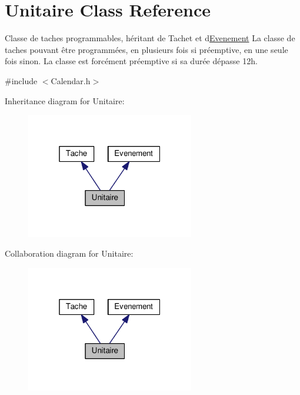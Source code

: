 \hypertarget{class_unitaire}{}\section{Unitaire Class Reference}
\label{class_unitaire}


Classe de taches programmables, héritant de Tachet et d\textquotesingle{}\hyperlink{class_evenement}{Evenement} La classe de taches pouvant être programmées, en plusieurs fois si préemptive, en une seule fois sinon. La classe est forcément préemptive si sa durée dépasse 12h.  




{\ttfamily \#include $<$Calendar.\+h$>$}



Inheritance diagram for Unitaire\+:\nopagebreak
\begin{figure}[H]
\begin{center}
\leavevmode
\includegraphics[width=208pt]{class_unitaire__inherit__graph}
\end{center}
\end{figure}


Collaboration diagram for Unitaire\+:\nopagebreak
\begin{figure}[H]
\begin{center}
\leavevmode
\includegraphics[width=208pt]{class_unitaire__coll__graph}
\end{center}
\end{figure}
